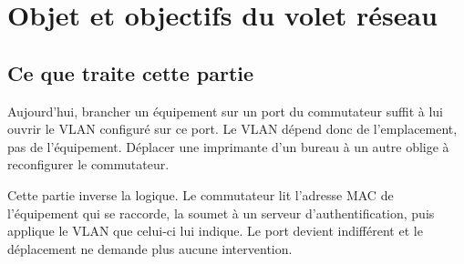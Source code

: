 \documentclass[11pt,a4paper]{article}
\begin{document}
\section{Objet et objectifs du volet réseau}

\subsection{Ce que traite cette partie}
Aujourd'hui, brancher un équipement sur un port du commutateur suffit à lui ouvrir le VLAN configuré sur ce port. Le VLAN dépend donc de l'emplacement, pas de l'équipement. Déplacer une imprimante d'un bureau à un autre oblige à reconfigurer le commutateur.

Cette partie inverse la logique. Le commutateur lit l'adresse MAC de l'équipement qui se raccorde, la soumet à un serveur d'authentification, puis applique le VLAN que celui-ci lui indique. Le port devient indifférent et le déplacement ne demande plus aucune intervention.
\end{document}
